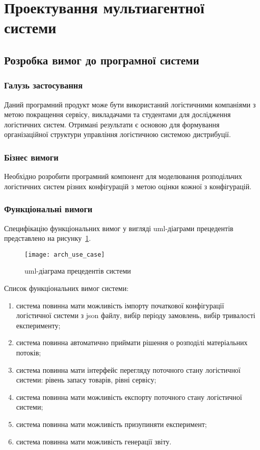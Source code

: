 
\section{Проектування мультиагентної системи}
\subsection{Розробка вимог до програмної системи}
\subsubsection{Галузь застосування}
Даний програмний продукт може бути використаний логістичними компаніями з метою покращення сервісу, викладачами та студентами для дослідження логістичних систем. Отримані результати є основою для формування організаційної структури управління логістичною системою дистрибуції.

\subsubsection{Бізнес вимоги}
Необхідно розробити програмний компонент для моделювання розподільчих логістичних систем різних конфігурацій з метою оцінки кожної з конфігурацій.

\subsubsection{Функціональні вимоги}
Специфікацію функціональних вимог у вигляді \acrshort{uml}-діаграми прецедентів представлено на рисунку~\ref{fig:system_usecase}.

\begin{figure}[H]
	\centering
	\texttt{[image: arch\_use\_case]}
	\caption{\acrshort{uml}-діаграма прецедентів системи}
	\label{fig:system_usecase}
\end{figure}

Список функціональних вимог системи:
\begin{enumerate}[label={\arabic*)}]
	\item система повинна мати можливість імпорту початкової конфігурації логістичної системи з \acrshort{json} файлу, вибір періоду замовлень, вибір тривалості експерименту;
	\item система повинна автоматично приймати рішення о розподілі матеріальних потоків;
	\item система повинна мати інтерфейс перегляду поточного стану логістичної системи: рівень запасу товарів, рівні сервісу; 
	\item система повинна мати можливість експорту поточного стану логістичної системи;
	\item система повинна мати можливість призупиняти експеримент;
	\item система повинна мати можливість генерації звіту.
\end{enumerate}

